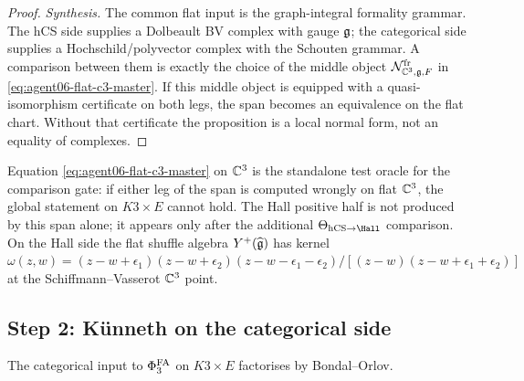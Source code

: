 \begin{proof}
\emph{Synthesis.}
The common flat input is the graph-integral formality grammar. The
hCS side supplies a Dolbeault BV complex with gauge $\mathfrak g$; the
categorical side supplies a Hochschild/polyvector complex with the
Schouten grammar. A comparison between them is exactly the choice of
the middle object
$\mathcal N_{\mathbb C^3,\mathfrak g,F}^{\mathrm{fr}}$ in
\eqref{eq:agent06-flat-c3-master}. If this middle object is equipped
with a quasi-isomorphism certificate on both legs, the span becomes an
equivalence on the flat chart. Without that certificate the proposition
is a local normal form, not an equality of complexes.
\end{proof}

\begin{remark}
\label{rem:agent06-flat-as-test-oracle}
Equation \eqref{eq:agent06-flat-c3-master} on $\mathbb C^3$ is the standalone
test oracle for the comparison gate: if either leg of the span is
computed wrongly on flat $\mathbb C^3$, the global statement on
$K3 \times E$ cannot hold. The Hall positive half is not produced by
this span alone; it appears only after the additional
$\Theta_{\hCS\to\Hall}$ comparison. On the Hall side the flat shuffle
algebra $Y^+(\widehat{\mathfrak g})$ has kernel
$\omega(z, w) = (z - w + \epsilon_1)(z - w + \epsilon_2)
(z - w - \epsilon_1 - \epsilon_2)/[(z - w)(z - w + \epsilon_1 +
\epsilon_2)]$ at the Schiffmann--Vasserot $\mathbb C^3$ point.
\end{remark}

\subsection*{Step 2: K\"unneth on the categorical side}
\label{sec:agent06-step2-cat-kunneth}

The categorical input to $\Phi^{\mathrm{FA}}_3$ on $K3 \times E$ factorises by
Bondal--Orlov.

